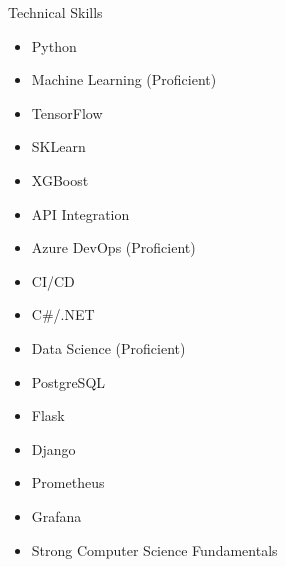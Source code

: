 \begin{rSection}{Technical Skills}

\begin{multicols}{2}
\begin{itemize}[leftmargin=*,nosep]
\item Python
\item Machine Learning (Proficient)
\item TensorFlow
\item SKLearn
\item XGBoost
\item API Integration
\item Azure DevOps (Proficient)
\item CI/CD
\item C#/.NET
\item Data Science (Proficient)
\item PostgreSQL
\item Flask
\item Django
\item Prometheus
\item Grafana
\item Strong Computer Science Fundamentals
\end{itemize}
\end{multicols}

\end{rSection}